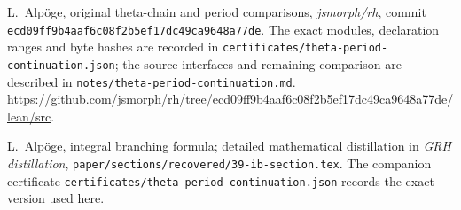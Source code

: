 L.~Alp\"oge, original theta-chain and period comparisons,
\emph{jsmorph/rh}, commit
\texttt{ecd09ff9b4aaf6c08f2b5ef17dc49ca9648a77de}.
The exact modules, declaration ranges and byte hashes are recorded in
\texttt{certificates/theta-period-continuation.json}; the source
interfaces and remaining comparison are described in
\texttt{notes/theta-period-continuation.md}.
\url{https://github.com/jsmorph/rh/tree/ecd09ff9b4aaf6c08f2b5ef17dc49ca9648a77de/lean/src}.

L.~Alp\"oge, integral branching formula; detailed mathematical
distillation in \emph{GRH distillation},
\texttt{paper/sections/recovered/39-ib-section.tex}.
The companion certificate \texttt{certificates/theta-period-continuation.json}
records the exact version used here.
